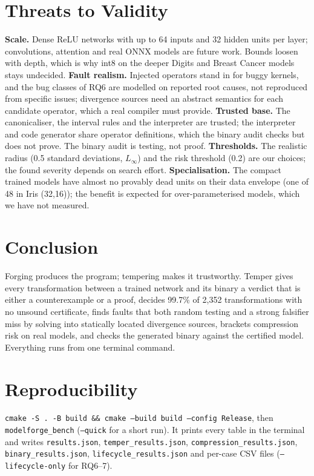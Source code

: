 \documentclass[conference]{IEEEtran}
\begin{document}
\section{Threats to Validity}
\textbf{Scale.} Dense ReLU networks with up to 64 inputs and 32 hidden units per layer; convolutions, attention and real ONNX models are future work. Bounds loosen with depth, which is why int8 on the deeper Digits and Breast Cancer models stays undecided.
\textbf{Fault realism.} Injected operators stand in for buggy kernels, and the bug classes of RQ6 are modelled on reported root causes, not reproduced from specific issues; divergence sources need an abstract semantics for each candidate operator, which a real compiler must provide.
\textbf{Trusted base.} The canonicaliser, the interval rules and the interpreter are trusted; the interpreter and code generator share operator definitions, which the binary audit checks but does not prove. The binary audit is testing, not proof.
\textbf{Thresholds.} The realistic radius (0.5 standard deviations, $L_\infty$) and the risk threshold (0.2) are our choices; the found severity depends on search effort.
\textbf{Specialisation.} The compact trained models have almost no provably dead units on their data envelope (one of 48 in Iris (32,16)); the benefit is expected for over-parameterised models, which we have not measured.

\section{Conclusion}
Forging produces the program; tempering makes it trustworthy. Temper gives every transformation between a trained network and its binary a verdict that is either a counterexample or a proof, decides 99.7\% of 2{,}352 transformations with no unsound certificate, finds faults that both random testing and a strong falsifier miss by solving into statically located divergence sources, brackets compression risk on real models, and checks the generated binary against the certified model. Everything runs from one terminal command.

\section*{Reproducibility}
\texttt{cmake -S . -B build \&\& cmake --build build --config Release}, then \texttt{modelforge\_bench} (\texttt{--quick} for a short run). It prints every table in the terminal and writes \texttt{results.json}, \texttt{temper\_results.json}, \texttt{compression\_results.json}, \texttt{binary\_results.json}, \texttt{lifecycle\_results.json} and per-case CSV files (\texttt{--lifecycle-only} for RQ6--7).



\end{document}
